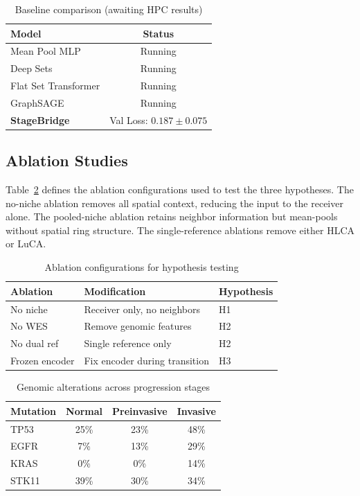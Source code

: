 \documentclass[conference]{IEEEtran}
\begin{document}
\begin{table}[h]
\caption{Baseline comparison (awaiting HPC results)}
\label{tab:baselines}
\centering
\begin{tabular}{lc}
\toprule
Model & Status \\
\midrule
Mean Pool MLP & Running \\
Deep Sets & Running \\
Flat Set Transformer & Running \\
GraphSAGE & Running \\
\textbf{StageBridge} & Val Loss: $0.187 \pm 0.075$ \\
\bottomrule
\end{tabular}
\end{table}

\subsection{Ablation Studies}

Table~\ref{tab:ablations} defines the ablation configurations used to test the three hypotheses. The no-niche ablation removes all spatial context, reducing the input to the receiver alone. The pooled-niche ablation retains neighbor information but mean-pools without spatial ring structure. The single-reference ablations remove either HLCA or LuCA.

\begin{table}[h]
\caption{Ablation configurations for hypothesis testing}
\label{tab:ablations}
\centering
\begin{tabular}{lll}
\toprule
Ablation & Modification & Hypothesis \\
\midrule
No niche & Receiver only, no neighbors & H1 \\
No WES & Remove genomic features & H2 \\
No dual ref & Single reference only & H2 \\
Frozen encoder & Fix encoder during transition & H3 \\
\bottomrule
\end{tabular}
\end{table}

\begin{table}[h]
\caption{Genomic alterations across progression stages}
\label{tab:genomic}
\centering
\begin{tabular}{lccc}
\toprule
Mutation & Normal & Preinvasive & Invasive \\
\midrule
TP53 & 25\% & 23\% & 48\% \\
EGFR & 7\% & 13\% & 29\% \\
KRAS & 0\% & 0\% & 14\% \\
STK11 & 39\% & 30\% & 34\% \\
\bottomrule
\end{tabular}
\end{table}
\end{document}
